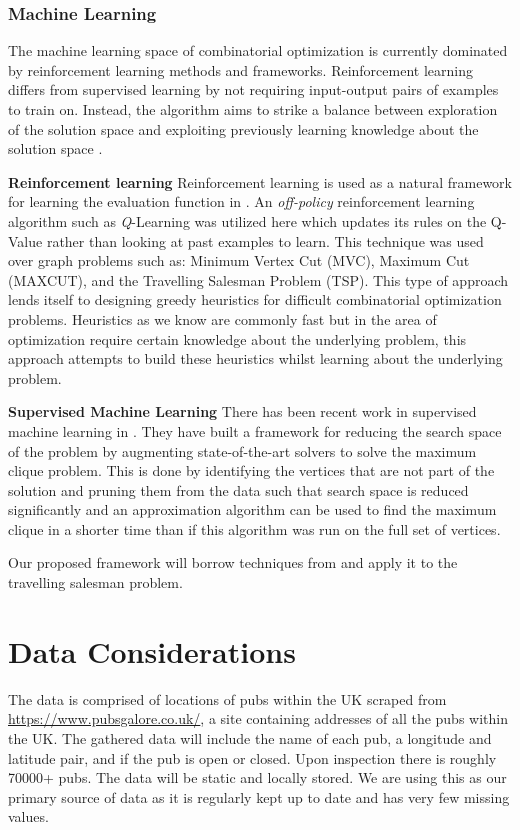 \documentclass[]{UCD_CS_FYP_Report}
\begin{document}
\subsection{Machine Learning}
The machine learning space of combinatorial optimization is currently dominated by reinforcement learning methods and frameworks. Reinforcement learning differs from supervised learning by not requiring input-output pairs of examples to train on. Instead, the algorithm aims to strike a balance between exploration of the solution space and exploiting previously learning knowledge about the solution space \cite{ReinforcementLearning}.

\textbf{Reinforcement learning}
Reinforcement learning is used as a natural framework for learning the evaluation function in \cite{DBLP:journals/corr/DaiKZDS17}. An \textit{off-policy} reinforcement learning algorithm such as \textit{Q}-Learning was utilized here which updates its rules on the Q-Value rather than looking at past examples to learn. This technique was used over graph problems such as: Minimum Vertex Cut (MVC), Maximum Cut (MAXCUT), and the Travelling Salesman Problem (TSP). This type of approach lends itself to designing greedy heuristics for difficult combinatorial optimization problems. Heuristics as we know are commonly fast but in the area of optimization require certain knowledge about the underlying problem, this approach attempts to build these heuristics whilst learning about the underlying problem.

\textbf{Supervised Machine Learning}
There has been recent work in supervised machine learning in \cite{iAAA}. They have built a framework for reducing the search space of the problem by augmenting state-of-the-art solvers to solve the maximum clique problem. This is done by identifying the vertices that are not part of the solution and pruning them from the data such that search space is reduced significantly and an approximation algorithm can be used to find the maximum clique in a shorter time than if this algorithm was run on the full set of vertices.

Our proposed framework will borrow techniques from \cite{iAAA} and apply it to the travelling salesman problem.




\chapter{Data Considerations}
The data is comprised of locations of pubs within the UK scraped from \url{https://www.pubsgalore.co.uk/}, a site containing addresses of all the pubs within the UK. The gathered data will include the name of each pub, a longitude and latitude pair, and if the pub is open or closed.  Upon inspection there is roughly 70000+ pubs. The data will be static and locally stored. We are using this as our primary source of data as it is regularly kept up to date and has very few missing values.
\end{document}
